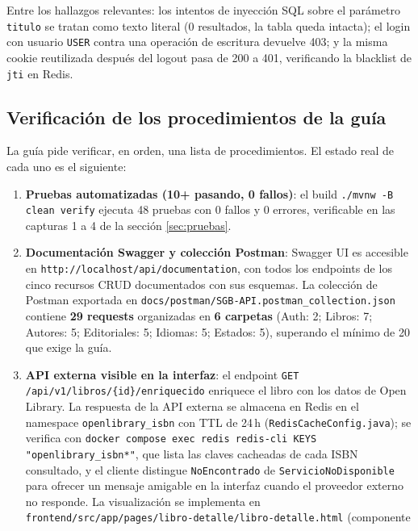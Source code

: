 \documentclass[12pt,a4paper]{article}
\begin{document}
Entre los hallazgos relevantes: los intentos de inyección SQL sobre el parámetro
\texttt{titulo} se tratan como texto literal (0 resultados, la tabla queda intacta); el
login con usuario \texttt{USER} contra una operación de escritura devuelve 403; y la
misma cookie reutilizada después del logout pasa de 200 a 401, verificando la blacklist
de \texttt{jti} en Redis.

\subsection{Verificación de los procedimientos de la guía}

La guía pide verificar, en orden, una lista de procedimientos. El estado real de cada uno
es el siguiente:

\begin{enumerate}[label=\textbf{Paso \arabic*.}, itemsep=2pt]
  \item \textbf{Pruebas automatizadas (10+ pasando, 0 fallos)}: el build
        \texttt{./mvnw -B clean verify} ejecuta 48 pruebas con 0 fallos y 0 errores,
        verificable en las capturas 1 a 4 de la sección \ref{sec:pruebas}.
  \item \textbf{Documentación Swagger y colección Postman}: Swagger UI es accesible en
        \texttt{http://localhost/api/documentation}, con todos los endpoints de los cinco
        recursos CRUD documentados con sus esquemas. La colección de Postman exportada en
        \texttt{docs/postman/SGB-API.postman\_collection.json} contiene \textbf{29
        requests} organizadas en \textbf{6 carpetas} (Auth: 2; Libros: 7; Autores: 5;
        Editoriales: 5; Idiomas: 5; Estados: 5), superando el mínimo de 20 que exige la
        guía.
  \item \textbf{API externa visible en la interfaz}: el endpoint
        \texttt{GET /api/v1/libros/\{id\}/enriquecido} enriquece el libro con los datos
        de Open Library. La respuesta de la API externa se almacena en Redis en el
        namespace \texttt{openlibrary\_isbn} con TTL de 24\,h
        (\texttt{RedisCacheConfig.java}); se verifica con
        \texttt{docker compose exec redis redis-cli KEYS "openlibrary\_isbn*"}, que lista
        las claves cacheadas de cada ISBN consultado, y el cliente distingue
        \texttt{NoEncontrado} de \texttt{ServicioNoDisponible} para ofrecer un mensaje
        amigable en la interfaz cuando el proveedor externo no responde. La
        visualización se implementa en
        \texttt{frontend/src/app/pages/libro-detalle/libro-detalle.html} (componente

\end{enumerate}
\end{document}
